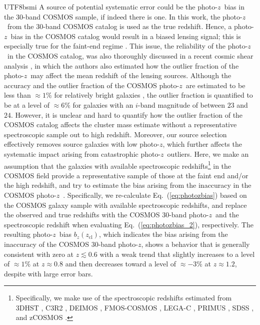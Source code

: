\documentclass[longauth]{aa}
\newcommand{\redshift}{\ensuremath{z}}
\newcommand{\zcl}{\ensuremath{z_{\mathrm{cl}}}}
\newcommand{\bz}{\ensuremath{b_{z}}}
\newcommand{\percent}{\ensuremath{\%}}
\begin{document}
\begin{CJK*}{UTF8}{bsmi}
A source of potential systematic error could be the photo-\redshift\ bias in the 30-band COSMOS sample, if indeed there is one.
In this work, the photo-\redshift\ from the 30-band COSMOS catalog \citep{laigle16} is used as the true redshift.
Hence, a photo-\redshift\ bias in the COSMOS catalog would result in a biased lensing signal; this is especially true for the faint-end regime \citep[see also][]{schrabback10}.
This issue, the reliability of the photo-\redshift\ in the COSMOS catalog, was also thoroughly discussed in a recent cosmic shear analysis \citep[see Section 8 in][]{hildebrandt20}, in which the authors also estimated how the outlier fraction of the photo-\redshift\ may affect the mean redshift of the lensing sources.
Although the accuracy and the outlier fraction of the COSMOS photo-\redshift\ are estimated to be less than $\approx1\percent$ for relatively bright galaxies \citep[$i\lesssim21$~mag;][]{laigle16}, the outlier fraction is quantified to be at a level of $\approx6\percent$ for galaxies with an $i$-band magnitude of between $23$ and $24$.
However, it is unclear and hard to quantify how the outlier fraction of the COSMOS catalog affects the cluster mass estimate without a representative spectroscopic sample out to high redshift.
Moreover, our source selection effectively removes source galaxies with low photo-\redshift, which further affects the systematic impact arising from catastrophic photo-\redshift\ outliers.
Here, we make an assumption that the galaxies with available spectroscopic redshifts\footnote{
Specifically, we make use of the spectroscopic redshifts estimated from
3DHST \citep{skelton14,momcheva16}, 
C3R2 \citep{masters19},
DEIMOS \citep{hasinger18}, 
FMOS-COSMOS \citep{silverman15}, 
LEGA-C \citep{straatman18}, 
PRIMUS \citep{coil11,cool13}, 
SDSS \citep{alam15,paris18}, 
and zCOSMOS \citep{lilly09}.
}
in the COSMOS field provide a representative sample of those at the faint end and/or the high redshift, and try to estimate the bias arising from the inaccuracy in the COSMOS photo-\redshift\ \citep[see also][]{schrabback18,schrabback18b,raihan20}.
Specifically, we re-calculate Eq.~(\ref{eq:photozbias}) based on the COSMOS galaxy sample with available spectroscopic redshifts, and replace the observed and true redshifts with the COSMOS 30-band photo-\redshift\ and the spectroscopic redshift when evaluating Eq.~(\ref{eq:photozbias_2}), respectively.
The resulting photo-\redshift\ bias $\bz\left(\zcl\right)$, which indicates the bias arising from the inaccuracy of the COSMOS 30-band photo-\redshift, shows a behavior that is generally consistent with zero at $\redshift\lesssim0.6$ with a weak trend that slightly increases to a level of $\approx1\percent$ at $\redshift\approx0.8$ and then decreases toward a level of $\approx-3\percent$ at $\redshift\approx1.2$, despite with large error bars.

\end{CJK*}
\end{document}
